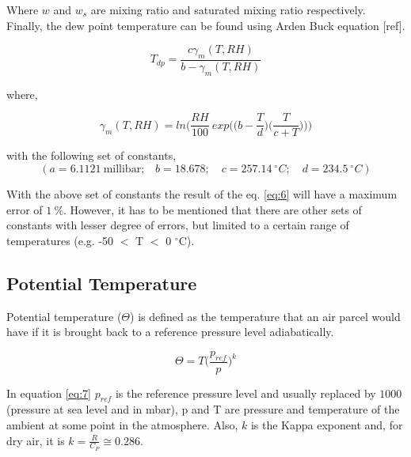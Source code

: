 \documentclass[a4paper,12pt]{article}
\numberwithin{equation}{section} %
\begin{document}
Where $w$ and $w_s$ are mixing ratio and saturated mixing ratio respectively. Finally, the dew point temperature can be found using Arden Buck equation [ref].

\vspace{0.25cm}
\begin{equation}\label{eq:6}
T_{dp} = \frac{c\gamma_m(T,RH)}{b - \gamma_m (T,RH)}
\end{equation}

where,

\begin{equation}
\gamma_m(T,RH) = ln\Bigg(\frac{RH}{100}\: exp\Big(\Big(b - \frac{T}{d}\Big)\Big(\frac{T}{c+T}\Big)\Big)\Bigg)
\end{equation}

\vspace{0.25cm}

with the following set of constants,
\begin{equation*}
(a = 6.1121\: \text{millibar;} \quad b = 18.678; \quad c = 257.14 \:^\circ C; \quad d = 234.5 \: ^\circ C)
\end{equation*}

\vspace{0.25cm}

With the above set of constants the result of the eq. \ref{eq:6} will have a maximum error of $1\: \%$. However, it has to be mentioned that there are other sets of constants with lesser degree of errors, but limited to a certain range of temperatures (e.g. -50 $<$ T $<$ 0 $^\circ$C). %


\subsection{Potential Temperature}

Potential temperature ($\Theta$) is defined as the temperature that an air parcel would have if it is brought back to a reference pressure level adiabatically.

\vspace{0.5cm}

\begin{equation}\label{eq:7}
\Theta = T\Big(\frac{p_{ref}}{p}\Big)^k
\end{equation}

\vspace{0.5cm}

In equation \ref{eq:7} $p_{ref}$ is the reference pressure level and usually replaced by $1000$ (pressure at sea level and in mbar), p and T are pressure and temperature of the ambient at some point in the atmosphere. Also, $k$ is the Kappa exponent and, for dry air, it is $k = \frac{R}{C_P}\cong 0.286$.
\end{document}
